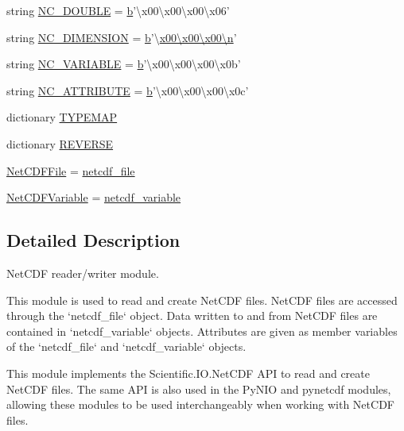 \begin{DoxyCompactItemize}
\item 
string \hyperlink{namespacescipy_1_1io_1_1netcdf_aae5b257aef68539a4abe9aad06265c2f}{N\+C\+\_\+\+D\+O\+U\+B\+L\+E} = \hyperlink{gen__mat5files_8m_a7b38767b3b6a8dae167e5afa4fc340b0}{b}'\textbackslash{}x00\textbackslash{}x00\textbackslash{}x00\textbackslash{}x06'
\item 
string \hyperlink{namespacescipy_1_1io_1_1netcdf_a05b6f5306fefa8958f42cb984c845399}{N\+C\+\_\+\+D\+I\+M\+E\+N\+S\+I\+O\+N} = \hyperlink{gen__mat5files_8m_a7b38767b3b6a8dae167e5afa4fc340b0}{b}'\textbackslash{}\hyperlink{indexexpr_8h_ab427e2e2b4d6cec55fa088ea2a692ace}{x00\textbackslash{}x00\textbackslash{}x00\textbackslash{}n}'
\item 
string \hyperlink{namespacescipy_1_1io_1_1netcdf_a2a774ccf3116460cd54aec7b66beaf5b}{N\+C\+\_\+\+V\+A\+R\+I\+A\+B\+L\+E} = \hyperlink{gen__mat5files_8m_a7b38767b3b6a8dae167e5afa4fc340b0}{b}'\textbackslash{}x00\textbackslash{}x00\textbackslash{}x00\textbackslash{}x0b'
\item 
string \hyperlink{namespacescipy_1_1io_1_1netcdf_af4966d0033acdf8a03ba8d2207d4b1e1}{N\+C\+\_\+\+A\+T\+T\+R\+I\+B\+U\+T\+E} = \hyperlink{gen__mat5files_8m_a7b38767b3b6a8dae167e5afa4fc340b0}{b}'\textbackslash{}x00\textbackslash{}x00\textbackslash{}x00\textbackslash{}x0c'
\item 
dictionary \hyperlink{namespacescipy_1_1io_1_1netcdf_a727ae029662cc9c04ad0fb7e01ac5947}{T\+Y\+P\+E\+M\+A\+P}
\item 
dictionary \hyperlink{namespacescipy_1_1io_1_1netcdf_a48d72c5076909026c28d1351b344d7bb}{R\+E\+V\+E\+R\+S\+E}
\item 
\hyperlink{namespacescipy_1_1io_1_1netcdf_ab85e2f87cc58c0462d526739f327e2ed}{Net\+C\+D\+F\+File} = \hyperlink{classscipy_1_1io_1_1netcdf_1_1netcdf__file}{netcdf\+\_\+file}
\item 
\hyperlink{namespacescipy_1_1io_1_1netcdf_a781bd7b55c877c1a3251544ef7c79cb4}{Net\+C\+D\+F\+Variable} = \hyperlink{classscipy_1_1io_1_1netcdf_1_1netcdf__variable}{netcdf\+\_\+variable}
\end{DoxyCompactItemize}


\subsection{Detailed Description}
\begin{DoxyVerb}NetCDF reader/writer module.

This module is used to read and create NetCDF files. NetCDF files are
accessed through the `netcdf_file` object. Data written to and from NetCDF
files are contained in `netcdf_variable` objects. Attributes are given
as member variables of the `netcdf_file` and `netcdf_variable` objects.

This module implements the Scientific.IO.NetCDF API to read and create
NetCDF files. The same API is also used in the PyNIO and pynetcdf
modules, allowing these modules to be used interchangeably when working
with NetCDF files.
\end{DoxyVerb}
 

